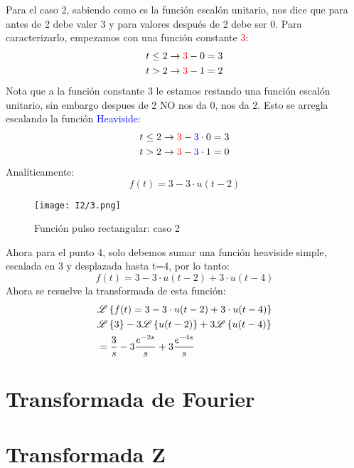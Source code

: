 \documentclass[12pt,fleqn,a4paper,oneside]{LegrandOrangeBook}
\begin{document}
Para el caso 2, sabiendo como es la función escalón unitario, nos dice que para antes de 2 debe valer 3 y para valores después de 2 debe ser 0. Para caracterizarlo, empezamos con una función constante \textcolor{red}{3}:
\begin{align*}
&t\leq 2\rightarrow \textcolor{red}{3}-0=3\\
&t>2\rightarrow \textcolor{red}{3}-1=2
\end{align*}
Nota que a la función constante 3 le estamos restando una función escalón unitario, sin embargo despues de 2 NO nos da 0, nos da 2. Esto se arregla escalando la función \textcolor{blue}{Heaviside}:
\begin{align*}
&t\leq 2\rightarrow \textcolor{red}{3}-\textcolor{blue}{3}\cdot 0=3\\
&t>2\rightarrow \textcolor{red}{3}-\textcolor{blue}{3}\cdot 1=0
\end{align*}
Analíticamente:
\begin{displaymath}
f(t)=3-3\cdot u(t-2)
\end{displaymath}
\begin{wrapfigure}{r}{0.4\linewidth}
  \begin{center}
    \texttt{[image: I2/3.png]}
  \end{center}
  \caption{Función pulso rectangular: caso 2}
\end{wrapfigure}
Ahora para el punto 4, solo debemos sumar una función heaviside simple, escalada en 3 y desplazada hasta t=4, por lo tanto:
\begin{displaymath}
f(t)=3-3\cdot u(t-2)+3\cdot u(t-4)
\end{displaymath}
Ahora se resuelve la transformada de esta función:
\begin{align*}
&\mathscr{L}\left\lbrace f(t)=3-3\cdot u(t-2)+3\cdot u(t-4)\right\rbrace\\
&\mathscr{L}\left\lbrace 3\right\rbrace-3\mathscr{L}\left\lbrace u(t-2)\right\rbrace+3\mathscr{L}\left\lbrace u(t-4)\right\rbrace\\
&=\frac{3}{s}-3\frac{e^{-2s}}{s}+3\frac{e^{-4s}}{s}
\end{align*}




\section{Transformada de Fourier}

\section{Transformada Z}
\end{document}
